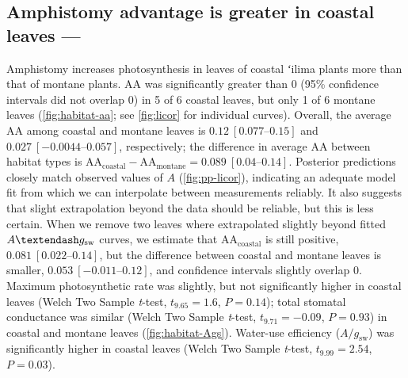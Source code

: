 \documentclass[
  letterpaper,
  DIV=11,
  numbers=noendperiod]{scrartcl}
\begin{document}
\hypertarget{amphistomy-advantage-is-greater-in-coastal-leaves}{%
\subsection{Amphistomy advantage is greater in coastal leaves
---}\label{amphistomy-advantage-is-greater-in-coastal-leaves}}

Amphistomy increases photosynthesis in leaves of coastal ʻilima plants
more than that of montane plants. \(\mathrm{AA}\) was significantly
greater than 0 (95\% confidence intervals did not overlap 0) in 5 of 6
coastal leaves, but only 1 of 6 montane leaves
(\autoref{fig:habitat-aa}; see \autoref{fig:licor} for individual
curves). Overall, the average \(\mathrm{AA}\) among coastal and montane
leaves is \(0.12~[\numrange{0.077}{0.15}]\) and
\(0.027~[\numrange{-0.0044}{0.057}]\), respectively; the difference in
average \(\mathrm{AA}\) between habitat types is
\(\mathrm{AA}_\text{coastal} - \mathrm{AA}_\text{montane} = 0.089~[\numrange{0.04}{0.14}]\).
Posterior predictions closely match observed values of \(A\)
(\autoref{fig:pp-licor}), indicating an adequate model fit from which we
can interpolate between measurements reliably. It also suggests that
slight extrapolation beyond the data should be reliable, but this is
less certain. When we remove two leaves where extrapolated slightly
beyond fitted \(A \textendash g_\mathrm{sw}\) curves, we estimate that
\(\mathrm{AA}_\text{coastal}\) is still positive,
\(0.081~[\numrange{0.022}{0.14}]\), but the difference between coastal
and montane leaves is smaller, \(0.053~[\numrange{-0.011}{0.12}]\), and
confidence intervals slightly overlap 0. Maximum photosynthetic rate was
slightly, but not significantly higher in coastal leaves (Welch Two
Sample \emph{t}-test, \(t_{9.65} = 1.6\), \(P = 0.14\)); total stomatal
conductance was similar (Welch Two Sample \emph{t}-test,
\(t_{9.71} = -0.09\), \(P = 0.93\)) in coastal and montane leaves
(\autoref{fig:habitat-Ags}). Water-use efficiency
(\(A / g_\mathrm{sw}\)) was significantly higher in coastal leaves
(Welch Two Sample \emph{t}-test, \(t_{9.99} = 2.54\), \(P = 0.03\)).
\end{document}
